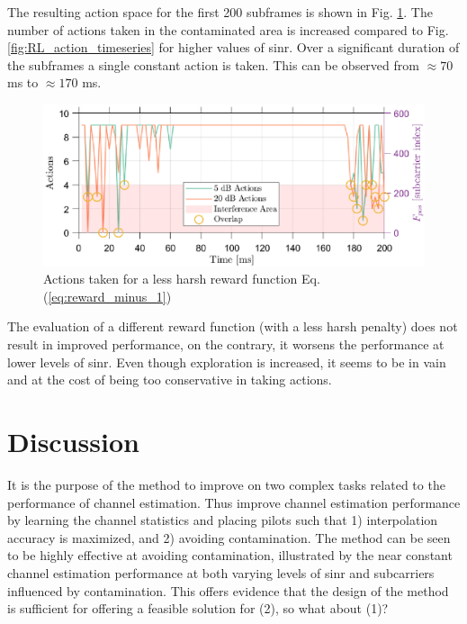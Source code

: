 The resulting action space for the first 200 subframes is shown in Fig. \ref{fig:RL_different_reward_-1_actions}. The number of actions taken in the contaminated area is increased compared to Fig. \ref{fig:RL_action_timeseries} for higher values of \gls{sinr}. Over a significant duration of the subframes a single constant action is taken. This can be observed from $\approx 70$ ms to $\approx 170$ ms.

\begin{figure}
    \centering
    \includegraphics{chapters/part_uplink/figures/results/rewardadjustsment_-1/action_timeseries.eps}
    \caption{Actions taken for a less harsh reward function Eq. (\ref{eq:reward_minus_1})}
    \label{fig:RL_different_reward_-1_actions}
\end{figure}

The evaluation of a different reward function (with a less harsh penalty) does not result in improved performance, on the contrary, it worsens the performance at lower levels of \gls{sinr}. Even though exploration is increased, it seems to be in vain and at the cost of being too conservative in taking actions.


\section{Discussion}
It is the purpose of the method to improve on two complex tasks related to the performance of channel estimation. Thus improve channel estimation performance by learning the channel statistics and placing pilots such that 1) interpolation accuracy is maximized, and 2) avoiding contamination. The method can be seen to be highly effective at avoiding contamination, illustrated by the near constant channel estimation performance at both varying levels of \gls{sinr} and subcarriers influenced by contamination. This offers evidence that the design of the method is sufficient for offering a feasible solution for (2), so what about (1)? 

